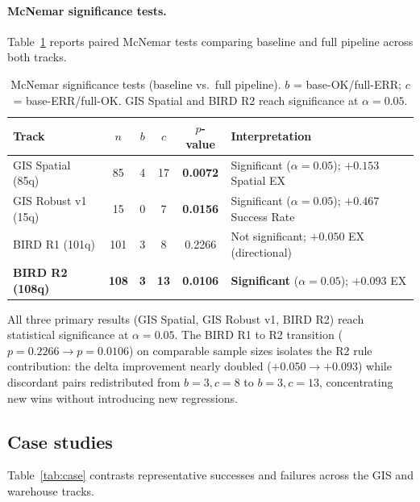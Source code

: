 \documentclass[11pt]{article}
\begin{document}
\paragraph{McNemar significance tests.}
Table~\ref{tab:mcnemar} reports paired McNemar tests comparing baseline and full pipeline across both tracks.

\begin{table}[t]
\centering
\footnotesize
\caption{McNemar significance tests (baseline vs.\ full pipeline). $b$ = base-OK/full-ERR; $c$ = base-ERR/full-OK. GIS Spatial and BIRD R2 reach significance at $\alpha=0.05$.}
\label{tab:mcnemar}
\begin{tabular}{lccccp{4.5cm}}
\toprule
Track & $n$ & $b$ & $c$ & $p$-value & Interpretation \\
\midrule
GIS Spatial (85q)   & 85  & 4  & 17 & \textbf{0.0072} & Significant ($\alpha=0.05$); $+0.153$ Spatial EX \\
GIS Robust v1 (15q) & 15  & 0  & 7  & \textbf{0.0156} & Significant ($\alpha=0.05$); $+0.467$ Success Rate \\
BIRD R1 (101q)      & 101 & 3  & 8  & 0.2266 & Not significant; $+0.050$ EX (directional) \\
\textbf{BIRD R2 (108q)} & \textbf{108} & \textbf{3} & \textbf{13} & \textbf{0.0106} & \textbf{Significant} ($\alpha=0.05$); $+0.093$ EX \\
\bottomrule
\end{tabular}
\end{table}

All three primary results (GIS Spatial, GIS Robust v1, BIRD R2) reach statistical significance at $\alpha=0.05$. The BIRD R1 to R2 transition ($p=0.2266 \to p=0.0106$) on comparable sample sizes isolates the R2 rule contribution: the delta improvement nearly doubled ($+0.050 \to +0.093$) while discordant pairs redistributed from $b=3, c=8$ to $b=3, c=13$, concentrating new wins without introducing new regressions.

\subsection{Case studies}

Table~\ref{tab:case} contrasts representative successes and failures across the GIS and warehouse tracks.
\end{document}
